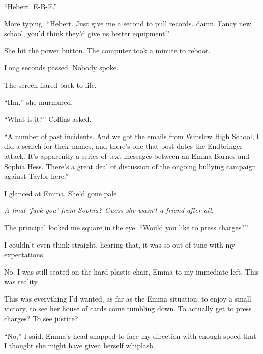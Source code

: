 ``Hebert.  E-B-E.''



More typing.  ``Hebert.  Just give me a second to pull records\ldots damn.  Fancy new school, you'd think they'd give us better equipment.''



She hit the power button.  The computer took a minute to reboot.



Long seconds passed.  Nobody spoke.



The screen flared back to life.



``Hm,'' she murmured.



``What is it?'' Collins asked.



``A number of past incidents.  And we got the emails from Winslow High School, I did a search for their names, and there's one that post-dates the Endbringer attack.  It's apparently a series of text messages between an Emma Barnes and Sophia Hess.  There's a great deal of discussion of the ongoing bullying campaign against Taylor here.''



I glanced at Emma.  She'd gone pale.



\emph{A final `fuck-you' from Sophia?  Guess she wasn't a friend after all}.



The principal looked me square in the eye.  ``Would you like to press charges?''



I couldn't even think straight, hearing that, it was so out of tune with my expectations.



No.  I was still seated on the hard plastic chair, Emma to my immediate left.  This was reality.



This was everything I'd wanted, as far as the Emma situation: to enjoy a small victory, to see her house of cards come tumbling down.  To actually get to press charges?  To see justice?



``No,'' I said.  Emma's head snapped to face my direction with enough speed that I thought she might have given herself whiplash.



